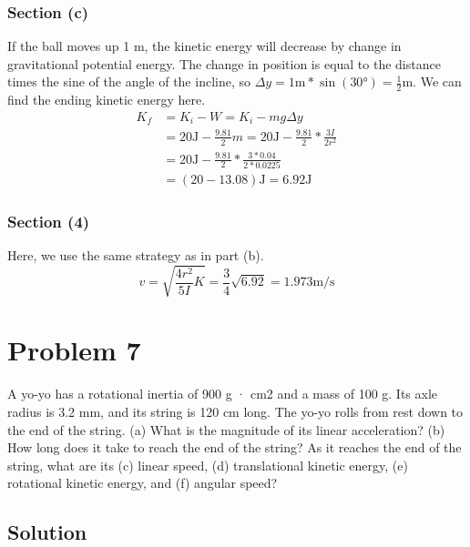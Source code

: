 \documentclass[12pt]{article}
\begin{document}
\subsubsection{Section (c)}
If the ball moves up 1 m, the kinetic energy will decrease by change in gravitational potential energy. The change in position is equal to the distance times the sine of the angle of the incline, so \(\Delta y = 1\unit{\meter} * \sin(30\unit{\degree}) = \frac{1}{2}\unit{\meter}\). We can find the ending kinetic energy here.
\begin{align}
    K_f &=  K_i - W
        =   K_i - mg\Delta y\\
        &=  20\unit{\joule} - \frac{9.81}{2}m
        =   20\unit{\joule} - \frac{9.81}{2}*\frac{3I}{2r^2}\\
        &=  20\unit{\joule} - \frac{9.81}{2}*\frac{3*0.04}{2*0.0225}\\
        &=  (20 - 13.08)\unit{\joule}
        =   \boxed{6.92\unit{\joule}}
\end{align}

\subsubsection{Section (4)}
Here, we use the same strategy as in part (b). 
\begin{equation}
    v   =   \sqrt{\frac{4r^2}{5I}K}
        =   \frac{3}{4}\sqrt{6.92}
        =   \boxed{1.973\unit{\meter/\second}}
\end{equation}


\pagebreak
\section{Problem 7}
A yo-yo has a rotational inertia of 900 g · cm2 and a mass of 100 g. Its axle radius is 3.2 mm, and its string is 120 cm long. The yo-yo rolls from rest down to the end of the string. (a) What is the magnitude of its linear acceleration? (b) How long does it take to reach the end of the string? As it reaches the end of the string, what are its (c) linear speed, (d) translational kinetic energy, (e) rotational kinetic energy, and (f) angular speed?

\subsection{Solution}


\pagebreak
\end{document}

